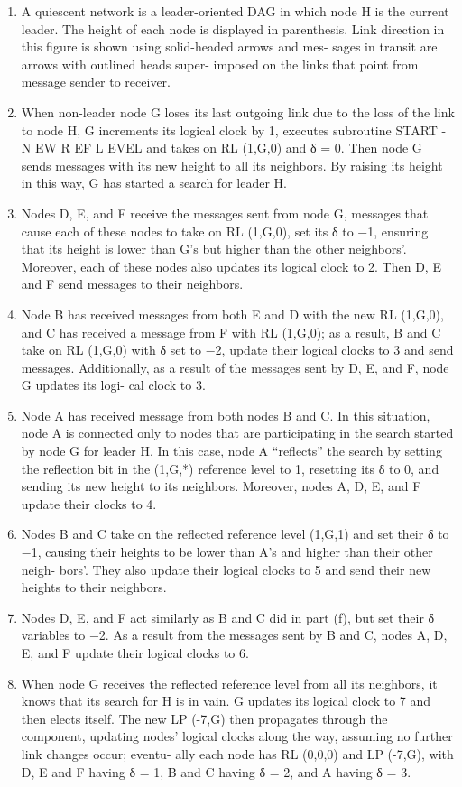 \documentclass{article}
\begin{document}
\begin{enumerate}[label=\alph *)]
\item A quiescent network is a leader-oriented DAG in
which node H is the current leader. The height of each
node is displayed in parenthesis. Link direction in this
figure is shown using solid-headed arrows and mes-
sages in transit are arrows with outlined heads super-
imposed on the links that point from message sender
to receiver.
\item When non-leader node G loses its last outgoing link
due to the loss of the link to node H, G increments
its logical clock by 1, executes subroutine START -
N EW R EF L EVEL and takes on RL (1,G,0) and δ = 0.
Then node G sends messages with its new height to all
its neighbors. By raising its height in this way, G has
started a search for leader H.
\item Nodes D, E, and F receive the messages sent from node
G, messages that cause each of these nodes to take on
RL (1,G,0), set its δ to −1, ensuring that its height is
lower than G’s but higher than the other neighbors’.
Moreover, each of these nodes also updates its logical
clock to 2. Then D, E and F send messages to their
neighbors.
\item Node B has received messages from both E and D with
the new RL (1,G,0), and C has received a message
from F with RL (1,G,0); as a result, B and C take on
RL (1,G,0) with δ set to −2, update their logical clocks
to 3 and send messages. Additionally, as a result of the
messages sent by D, E, and F, node G updates its logi-
cal clock to 3.
\item Node A has received message from both nodes B and
C. In this situation, node A is connected only to nodes
that are participating in the search started by node G
for leader H. In this case, node A “reflects” the search
by setting the reflection bit in the (1,G,*) reference
level to 1, resetting its δ to 0, and sending its new
height to its neighbors. Moreover, nodes A, D, E, and
F update their clocks to 4.
\item Nodes B and C take on the reflected reference level
(1,G,1) and set their δ to −1, causing their heights to
be lower than A’s and higher than their other neigh-
bors’. They also update their logical clocks to 5 and
send their new heights to their neighbors.
\item Nodes D, E, and F act similarly as B and C did in part
(f), but set their δ variables to −2. As a result from
the messages sent by B and C, nodes A, D, E, and F
update their logical clocks to 6.
\item When node G receives the reflected reference level
from all its neighbors, it knows that its search for H is
in vain. G updates its logical clock to 7 and then elects
itself. The new LP (-7,G) then propagates through the
component, updating nodes’ logical clocks along the
way, assuming no further link changes occur; eventu-
ally each node has RL (0,0,0) and LP (-7,G), with D,
E and F having δ = 1, B and C having δ = 2, and A
having δ = 3.
\end{enumerate}
\end{document}
